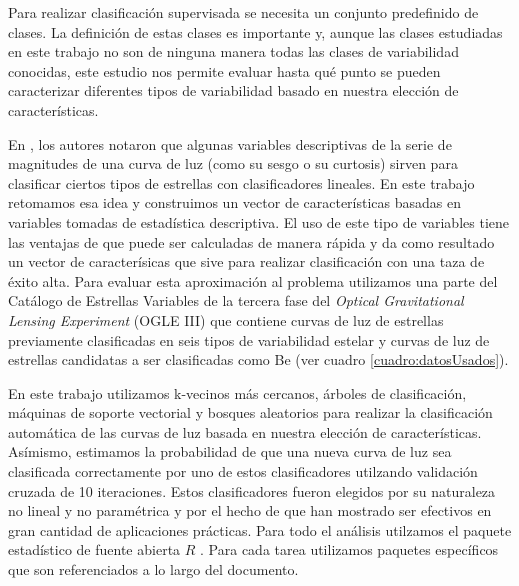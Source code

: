 \documentclass[letterpaper,12pt]{book}
\begin{document}
Para realizar clasificación supervisada se necesita un conjunto predefinido de clases. La definición de estas clases es importante y, aunque las clases estudiadas en este trabajo no son de ninguna manera todas las clases de variabilidad conocidas, este estudio nos permite evaluar hasta qué punto se pueden caracterizar diferentes tipos de variabilidad basado en nuestra elección de características. 

En \cite{rodriguez_feliciano_alisis_2012, sabogal_search_2014}, los autores notaron que algunas variables descriptivas de la serie de magnitudes de una curva de luz (como su sesgo o su curtosis) sirven para clasificar ciertos tipos de estrellas con clasificadores lineales. En este trabajo retomamos esa idea y construimos un vector de características basadas en variables tomadas de estadística descriptiva. El uso de este tipo de variables tiene las ventajas de que puede ser calculadas de manera rápida y da como resultado un vector de caracterísicas que sive para realizar clasificación con una taza de éxito alta. Para evaluar esta aproximación al problema utilizamos una parte del Catálogo de Estrellas Variables de la tercera fase del \textit{Optical Gravitational Lensing Experiment} (OGLE III)\cite{soszynski_optical_2011-2,soszynski_optical_2010,soszynski_optical_2009-1,soszynski_optical_2011,soszynski_optical_2010-2,soszynski_optical_2008-1,soszynski_optical_2013-1,soszynski_optical_2011-1,soszynski_optical_2009,pawlak_eclipsing_2013,graczyk_optical_2011,poleski_optical_2010,soszynski_optical_2013,soszynski_optical_2010-1,soszynski_optical_2008} que contiene curvas de luz  de estrellas previamente clasificadas en seis tipos de variabilidad estelar y curvas de luz de estrellas candidatas a ser clasificadas como Be (ver cuadro \ref{cuadro:datosUsados}).

En este trabajo utilizamos k-vecinos más cercanos, árboles de clasificación, máquinas de soporte vectorial y bosques aleatorios para realizar la clasificación automática de las curvas de luz basada en nuestra elección de características. Asímismo, estimamos la probabilidad de que una nueva curva de luz sea clasificada correctamente por uno de estos clasificadores utilzando validación cruzada de 10 iteraciones.  Estos clasificadores fueron elegidos por su naturaleza no lineal y no paramétrica y por el hecho de que han mostrado ser efectivos en gran cantidad de aplicaciones prácticas. Para todo el análisis utilzamos el paquete estadístico de fuente abierta $R$ \cite{rbase}. Para cada tarea utilizamos paquetes específicos que son referenciados a lo largo del documento. 
\end{document}
